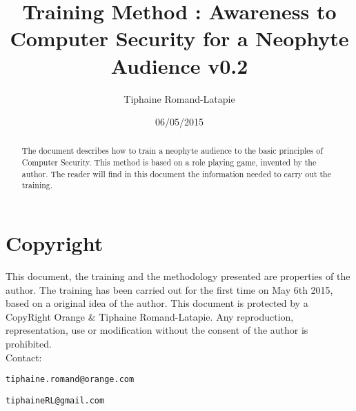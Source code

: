 \documentclass[11pt]{article} %
\title{Training Method : Awareness to Computer Security for a Neophyte Audience v0.2}
\author{Tiphaine Romand-Latapie}
\date{06/05/2015} %
\begin{document}
\maketitle

\begin{abstract}
The document describes how to train a neophyte audience to the
basic principles of Computer Security. This method is based on a
role playing game, invented by the author. The reader will find in
this document the information needed to carry out the training.
\end{abstract}

\section{Copyright}
This document, the training and the methodology presented are
properties of the author. The training has been carried out for the
first time on May 6th 2015, based on a original idea of the
author. This document is protected by a CopyRight Orange \&
Tiphaine Romand-Latapie. Any reproduction, representation, use or
modification without the consent of the author is prohibited.
\\
Contact: 
\begin{verbatim}tiphaine.romand@orange.com\end{verbatim}
\begin{verbatim}tiphaineRL@gmail.com\end{verbatim}
\end{document}
